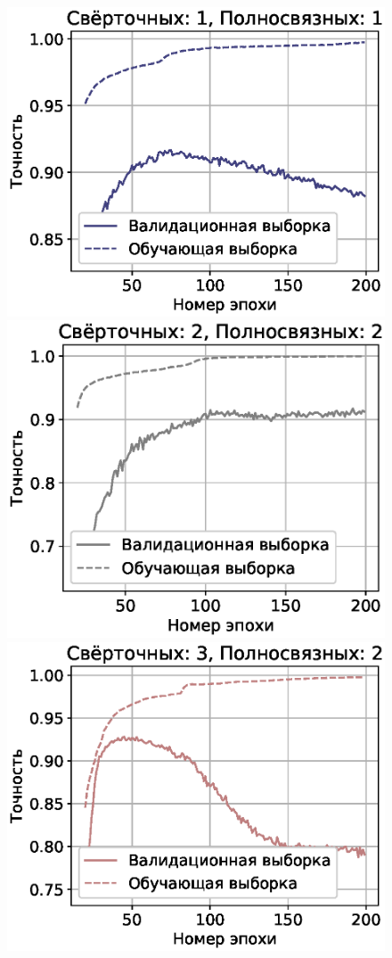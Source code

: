 \documentclass[12pt,twoside]{article}
\begin{document}
\begin{figure}[H]
    \includegraphics[scale=0.45]{charts/cnn11.eps}
    \includegraphics[scale=0.45]{charts/cnn22.eps}
    \includegraphics[scale=0.45]{charts/cnn32.eps}

\end{figure}
\end{document}
